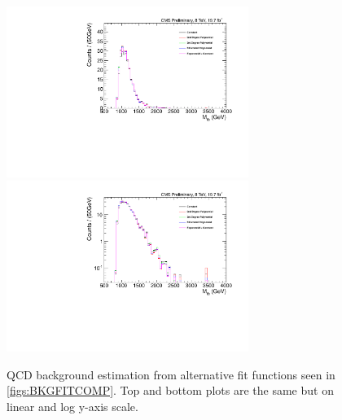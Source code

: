 \begin{figure}[htcb]
\begin{center}
\includegraphics[width=0.7\textwidth]{AN-13-004/figs/BKGCOMP.pdf}\\
\includegraphics[width=0.7\textwidth]{AN-13-004/figs/BKGCOMPLOG.pdf}
\caption{
QCD background estimation from alternative fit functions seen in \ref{figs:BKGFITCOMP}. Top and bottom plots are the same but on linear and log y-axis scale.
}
\label{figs:BKGCOMP}
\end{center}
\end{figure}

